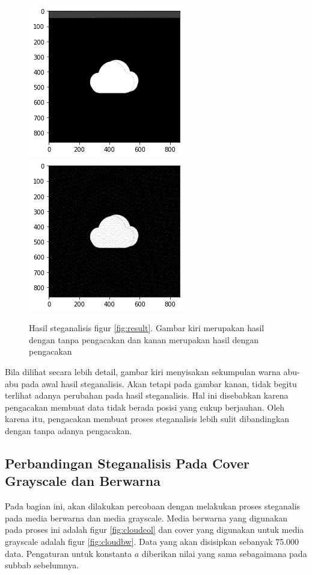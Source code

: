 \documentclass[10pt,conference]{IEEEtran}
\theoremstyle{definition}
\begin{document}
\begin{figure}
    \centerline{
        \includegraphics[width=0.4\columnwidth]{steganalisis-5000-bw.png}
        \includegraphics[width=0.4\columnwidth]{steganalisis-5000-bw-random.png}
    }
    \caption{Hasil steganalisis figur \ref{fig:result}. Gambar kiri merupakan hasil dengan tanpa pengacakan dan kanan merupakan hasil dengan pengacakan}
    \label{fig:steganalisis5000} 
\end{figure}

Bila dilihat secara lebih detail, gambar kiri menyisakan sekumpulan warna abu-abu pada awal hasil steganalisis. Akan tetapi pada gambar kanan, tidak begitu terlihat adanya perubahan pada hasil steganalisis.
Hal ini disebabkan karena pengacakan membuat data tidak berada posisi yang cukup berjauhan. Oleh karena itu, pengacakan membuat proses steganalisis lebih sulit dibandingkan dengan tanpa adanya pengacakan.

\subsection{Perbandingan Steganalisis Pada Cover Grayscale dan Berwarna}

Pada bagian ini, akan dilakukan percobaan dengan melakukan proses steganalis pada media berwarna dan media grayscale. Media berwarna yang digunakan pada proses ini adalah figur \ref{fig:cloudcol} dan cover yang digunakan
untuk media grayscale adalah figur \ref{fig:cloudbw}. Data yang akan disisipkan sebanyak 75.000 data. Pengaturan untuk konstanta $a$ diberikan nilai yang sama sebagaimana pada subbab sebelumnya.
\end{document}
